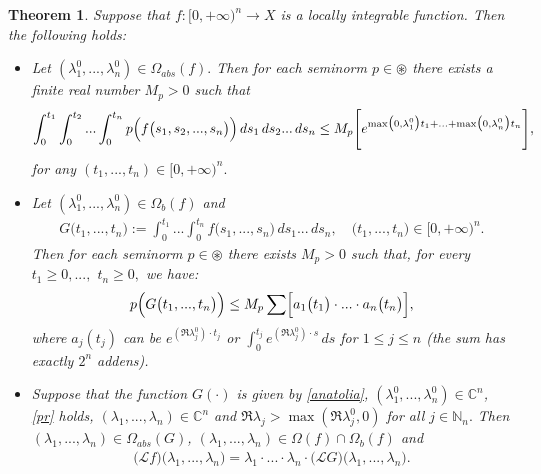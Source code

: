 \documentclass{amsart}
\newtheorem{thm}{Theorem}[section]
\theoremstyle{definition}
\theoremstyle{remark}
\numberwithin{equation}{section}
\begin{document}
\begin{thm}\label{sas}
Suppose that $f: [0,+\infty)^{n}\rightarrow X$ is a locally integrable function. Then the following holds:
\begin{itemize}
\item[(i)] Let  $(\lambda_{1}^{0},...,\lambda_{n}^{0})\in \Omega_{abs}(f).$ Then for each seminorm $p\in \circledast$ there exists a finite real number $M_{p}>0$ such that
\begin{align}\label{antid}
\int^{t_{1}}_{0}\int^{t_{2}}_{0}...\int^{t_{n}}_{0}p\Bigl( f\bigl( s_{1},s_{2},...,s_{n}\bigr)\Bigr)\, ds_{1} \, ds_{2}...\, ds_{n}\leq M_{p}\Biggl[ e^{\max \bigl(0,\lambda_{1}^{0}\bigr)t_{1}+...+\max \bigl(0,\lambda_{n}^{0}\bigr)t_{n}}\Biggr],
\end{align}
for any $(t_{1},...,t_{n}) \in [0,+\infty)^{n}.$
\item[(ii)] Let  $(\lambda_{1}^{0},...,\lambda_{n}^{0})\in \Omega_{b}(f)$ and
\begin{align}\label{anatolia}
G\bigl( t_{1},...,t_{n} \bigr):=\int^{t_{1}}_{0}...\int^{t_{n}}_{0}f\bigl( s_{1},...,s_{n}\bigr)\, ds_{1}...\, ds_{n},\quad \bigl( t_{1},...,t_{n} \bigr)\in [0,+\infty)^{n}.
\end{align}
Then for each seminorm $p\in \circledast$ there exists $M_{p}>0$ such that, for every $t_{1}\geq 0,...,$ $t_{n}\geq 0,$ we have: \begin{align}\label{pr}  p\Bigl(G\bigl( t_{1},...,t_{n} \bigr)\Bigr)
 \leq M_{p}\sum \Bigl[a_{1}\bigl(t_{1}\bigr)\cdot ...\cdot a_{n}\bigl(t_{n}\bigr)\Bigr] ,
\end{align}
where $a_{j}(t_{j})$ can be $ e^{(\Re \lambda_{j}^{0})\cdot t_{j}}$ or $\int^{t_{j}}_{0}e^{(\Re \lambda_{j}^{0})\cdot s}\, ds$ for $1\leq j\leq n$ (the sum has exactly $2^{n}$ addens).
\item[(iii)] Suppose that the function $G(\cdot)$ is given by \eqref{anatolia}, $(\lambda_{1}^{0},...,\lambda_{n}^{0})\in {\mathbb C}^{n}$, \eqref{pr} holds, $(\lambda_{1},...,\lambda_{n})\in {\mathbb C}^{n}$ and $\Re \lambda_{j}>\max(\Re \lambda_{j}^{0},0)$ for all $j\in {\mathbb N}_{n}.$ Then $(\lambda_{1},...,\lambda_{n})\in \Omega_{abs}(G)$, $(\lambda_{1},...,\lambda_{n})\in \Omega (f) \cap \Omega_{b}(f)$ and
\begin{align}\label{ej}
\bigl( {\mathcal L} f\bigr) \bigl(\lambda_{1},...,\lambda_{n} \bigr)=\lambda_{1}\cdot ... \cdot \lambda_{n}\cdot \bigl( {\mathcal L} G\bigr) \bigl(\lambda_{1},...,\lambda_{n} \bigr).
\end{align}
\end{itemize}
\end{thm}
\end{document}
